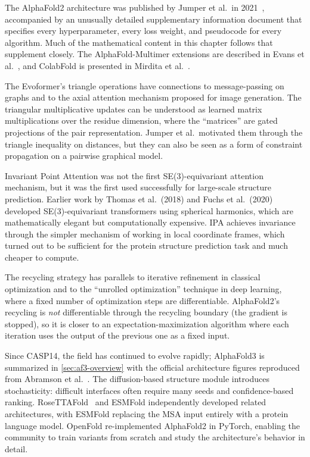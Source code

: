 The AlphaFold2 architecture was published by Jumper et al.\ in 2021~\cite{jumper2021}, accompanied by an unusually detailed supplementary information document that specifies every hyperparameter, every loss weight, and pseudocode for every algorithm.
Much of the mathematical content in this chapter follows that supplement closely.
The AlphaFold-Multimer extensions are described in Evans et al.~\cite{evans2022}, and ColabFold is presented in Mirdita et al.~\cite{mirdita2022}.

The Evoformer's triangle operations have connections to message-passing on graphs and to the axial attention mechanism proposed for image generation.
The triangular multiplicative updates can be understood as learned matrix multiplications over the residue dimension, where the ``matrices'' are gated projections of the pair representation.
Jumper et al.\ motivated them through the triangle inequality on distances, but they can also be seen as a form of constraint propagation on a pairwise graphical model.

Invariant Point Attention was not the first SE(3)-equivariant attention mechanism, but it was the first used successfully for large-scale structure prediction.
Earlier work by Thomas et al.\ (2018) and Fuchs et al.\ (2020) developed SE(3)-equivariant transformers using spherical harmonics, which are mathematically elegant but computationally expensive.
IPA achieves invariance through the simpler mechanism of working in local coordinate frames, which turned out to be sufficient for the protein structure prediction task and much cheaper to compute.

The recycling strategy has parallels to iterative refinement in classical optimization and to the ``unrolled optimization'' technique in deep learning, where a fixed number of optimization steps are differentiable.
AlphaFold2's recycling is \emph{not} differentiable through the recycling boundary (the gradient is stopped), so it is closer to an expectation-maximization algorithm where each iteration uses the output of the previous one as a fixed input.

Since CASP14, the field has continued to evolve rapidly; AlphaFold3 is summarized in \cref{sec:af3-overview} with the official architecture figures reproduced from Abramson et al.~\cite{abramson2024}.
The diffusion-based structure module introduces stochasticity: difficult interfaces often require many seeds and confidence-based ranking.
RoseTTAFold~\cite{yang2020} and ESMFold independently developed related architectures, with ESMFold replacing the MSA input entirely with a protein language model.
OpenFold re-implemented AlphaFold2 in PyTorch, enabling the community to train variants from scratch and study the architecture's behavior in detail.

